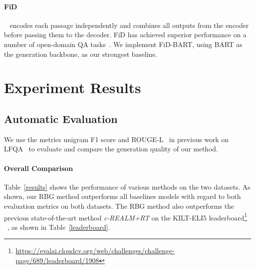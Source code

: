 \documentclass[11pt]{article}
\begin{document}
\paragraph{FiD} ~\cite{izacard2021leveraging} encodes each passage independently and combines all outputs from the encoder before passing them to the decoder. FiD has achieved superior performance on a number of open-domain QA tasks~\cite{izacard2021leveraging}. We implement FiD-BART, using BART as the generation backbone, as our strongest baseline.


\section{Experiment Results}
\vspace{-3pt}
\subsection{Automatic Evaluation}
\vspace{-3pt}

We use the metrics unigram F1 score and ROUGE-L~\cite{lin2004rouge} in previous work on LFQA~\cite{petroni2021kilt, krishna2021hurdles} to evaluate and compare the generation quality of our method. 

\vspace{-5pt}
\paragraph{Overall Comparison} Table~\ref{results} shows the performance of various methods on the two datasets. As shown, our RBG method outperforms all baselines models with regard to both evaluation metrics on both datasets. The RBG method also outperforms the previous state-of-the-art method \textit{c-REALM+RT} on the KILT-ELI5 leaderboard\footnote{\url{ https://evalai.cloudcv.org/web/challenges/challenge-page/689/leaderboard/1908}} ~\cite{krishna2021hurdles}, as shown in Table~\ref{leaderboard}.
\end{document}
